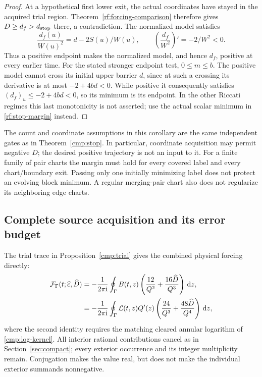 \begin{proof}
At a hypothetical first lower exit, the actual coordinates have stayed
in the acquired trial region. Theorem~\ref{rf:forcing-comparison}
therefore gives $D\ge d_f>d_{\rm stop}$ there, a contradiction.
The normalized model satisfies
\[
 \frac{d_f(u)}{W(u)^2}=d-2S(u)/W(u),\qquad
 \left(\frac{d_f}{W^2}\right)'=-2/W^2<0.
\]
Thus a positive endpoint makes the normalized model, and hence $d_f$,
positive at every earlier time. For the stated stronger endpoint test,
$0\le m\le b$. The positive model cannot cross its initial upper
barrier $d$, since at such a crossing its derivative is at most
$-2+4bd<0$. While positive it consequently satisfies
$(d_f)_u\le-2+4bd<0$, so its minimum is its endpoint. In the other
Riccati regimes this last monotonicity is not asserted; use the actual
scalar minimum in \eqref{rf:stop-margin} instead.
\end{proof}

The count and coordinate assumptions in this corollary are the same
independent gates as in Theorem~\ref{cmp:stop}. In particular, coordinate
acquisition may permit negative $D$; the desired positive trajectory is
not an input to it. For a finite family of pair charts the margin must
hold for every covered label and every chart/boundary exit. Passing only
one initially minimizing label does not protect an evolving block
minimum. A regular merging-pair chart also does not regularize its
neighboring edge charts.

\subsection{Complete source acquisition and its error budget}

The trial trace in Proposition~\ref{cmp:trial} gives the combined
physical forcing directly:
\begin{align}
 \mathcal F_\Gamma(t;\widehat c,\widehat D)
 &=-\frac1{2\pi\mathrm i}\oint_\Gamma B(t,z)
       \left(\frac{12}{Q^2}+\frac{16\widehat D}{Q^3}\right)\,\mathrm d z,
       \notag\\
 &=-\frac1{2\pi\mathrm i}\oint_\Gamma\mathcal L(t,z)Q'(z)
       \left(\frac{24}{Q^3}+\frac{48\widehat D}{Q^4}\right)\,\mathrm d z,
 \label{rf:source-kernel}
\end{align}
where the second identity requires the matching cleared annular
logarithm of \eqref{cmp:log-kernel}. All interior rational contributions
cancel as in Section~\ref{sec:compact}; every exterior occurrence and
its integer multiplicity remain. Conjugation makes the value real, but
does not make the individual exterior summands nonnegative.

